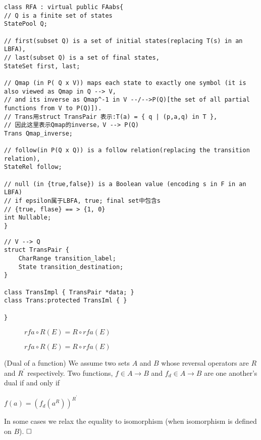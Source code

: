 \begin{lstlisting}
class RFA : virtual public FAabs{
// Q is a finite set of states
StatePool Q;

// first(subset Q) is a set of initial states(replacing T(s) in an LBFA),
// last(subset Q) is a set of final states,
StateSet first, last;

// Qmap (in P( Q x V)) maps each state to exactly one symbol (it is also viewed as Qmap in Q --> V,
// and its inverse as Qmap^-1 in V --/-->P(Q)[the set of all partial functions from V to P(Q)]).
// Trans用struct TransPair 表示:T(a) = { q | (p,a,q) in T },
// 因此这里表示Qmap的inverse，V --> P(Q)
Trans Qmap_inverse;

// follow(in P(Q x Q)) is a follow relation(replacing the transition relation),
StateRel follow;

// null (in {true,false}) is a Boolean value (encoding s in F in an LBFA)
// if epsilon属于LBFA, true; final set中包含s
// {true, flase} == > {1, 0}
int Nullable;
}
\end{lstlisting}

\begin{lstlisting}
// V --> Q
struct TransPair {
	CharRange transition_label;
	State transition_destination;
}

class TransImpl { TransPair *data; }
class Trans:protected TransIml { }

}
\end{lstlisting}


\begin{figure}[htbp]
$rfa\circ R(E) = R\circ rfa(E)$\\
\caption{$rfa\circ R(E) = R\circ rfa(E)$}
\end{figure}

\begin{definition} (Dual of a function)
We assume two sets $A$ and $B$ whose reversal operators are $R$ and $R^\prime$ respectively. Two functions, $f\in A\to B$ and $f_d \in A\to B$ are one another's dual if and only if

$f(a)=(f_d(a^R))^{R^\prime}$

In some cases we relax the equality to isomorphism (when isomorphism is defined on $B$). $\hfill\square$
\end{definition}


